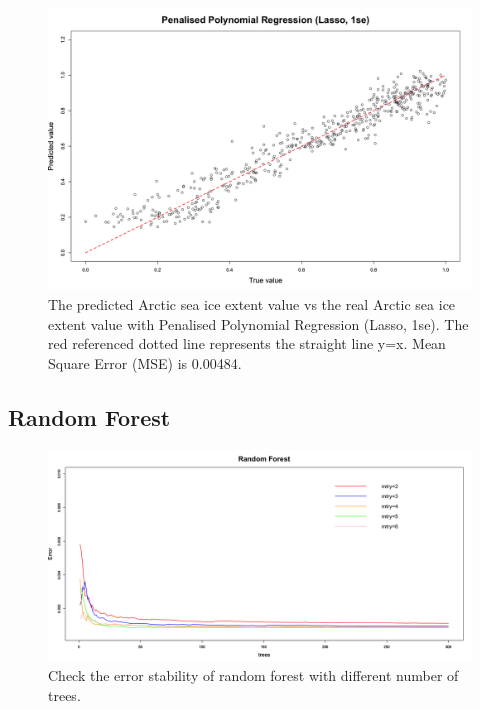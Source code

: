 \begin{figure}[htbp]
\centering
\includegraphics[width = 1.0\textwidth]{Figure/4.2.5-PPR-1se.png}
\caption{The predicted Arctic sea ice extent value vs the real Arctic sea ice extent value with Penalised Polynomial Regression (Lasso, 1se). The red referenced dotted line represents the straight line y=x. Mean Square Error (MSE) is 0.00484.}
\label{4.2.5-PPR-1se}
\end{figure}



\subsection{Random Forest} %

\begin{figure}[htbp]
\centering
\includegraphics[width = 1.0\textwidth]{Figure/4.2.6-RF-200TreesStable.png}
\caption{Check the error stability of random forest with different number of trees.}
\label{4.2.6-RF-200TreesStable}
\end{figure}

